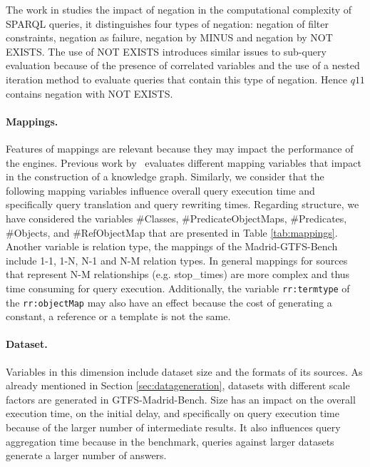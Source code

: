 The work in \citep{angles2016negation} studies the impact of negation in the computational complexity of SPARQL queries, it distinguishes four types of negation: negation of filter constraints, negation as failure, negation by MINUS and negation by NOT EXISTS.  The use of NOT EXISTS introduces similar issues to sub-query evaluation because of the  presence of correlated variables and the use of a nested iteration method to evaluate queries that contain this type of negation. Hence $q11$ contains negation with NOT EXISTS.


\noindent\paragraph{\textbf{Mappings.}}
Features of mappings are relevant because they may impact  the performance of the engines. Previous work by~\citep{chaves2019what} evaluates different mapping variables that impact in the construction of a knowledge graph. Similarly, we consider that the following mapping variables influence overall query execution time and specifically query translation and query rewriting times. Regarding structure, we have considered the variables \#Classes, \#PredicateObjectMaps, \#Predicates, \#Objects, and \#RefObjectMap that are presented in Table \ref{tab:mappings}. Another variable is relation type, the mappings of the Madrid-GTFS-Bench include 1-1, 1-N, N-1 and N-M relation types. In general mappings for sources that represent N-M relationships (e.g. stop\_times) are more complex and thus time consuming for query execution. Additionally, the variable \texttt{rr:termtype} of the \texttt{rr:objectMap} may also have an effect because the cost of generating a constant, a reference or a template is not the same.

\noindent\paragraph{\textbf{Dataset.}}
Variables in this dimension include dataset size and the formats of its sources. As already mentioned in Section \ref{sec:datageneration}, datasets with different scale factors are generated in GTFS-Madrid-Bench. Size has an impact on the overall execution time, on the initial delay, and specifically on query execution time because of the larger number of intermediate results. It also influences query aggregation time because in the benchmark, queries against larger datasets generate a larger number of answers.

